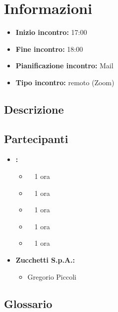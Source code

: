 \section{Informazioni}
\begin{itemize}
	\item \textbf{Inizio incontro:} 17:00
	\item \textbf{Fine incontro:} 18:00
	\item \textbf{Pianificazione incontro:} Mail
	\item \textbf{Tipo incontro:} remoto (Zoom)
\end{itemize}

\subsection{Descrizione}
\DocDescription

\subsection{Partecipanti}

\begin{itemize}
	\item \textbf{\GroupName:}
	\begin{itemize}
		\item \tommaso \ \rightarrow\ 1 ora
		\item \riccardo \ \rightarrow\ 1 ora
		\item \raul \ \rightarrow\ 1 ora 
		\item \martina \ \rightarrow\ 1 ora 
		\item \sebastiano \ \rightarrow\ 1 ora
	\end{itemize}
	\item \textbf{Zucchetti S.p.A.:}
    \begin{itemize}
        \item Gregorio Piccoli
    \end{itemize}
\end{itemize}

\subsection{Glossario}
\GlossarioIntroduzioneVE

\clearpage